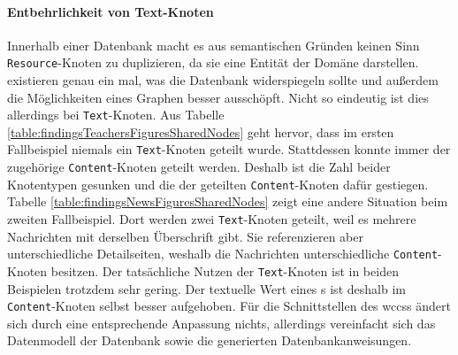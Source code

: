     \paragraph*{Entbehrlichkeit von Text-Knoten}
    Innerhalb einer Datenbank macht es aus semantischen Gründen keinen Sinn
    \texttt{Resource}-Knoten zu duplizieren,
    da sie eine Entität der Domäne darstellen.
    {\resources} existieren genau ein mal, was die Datenbank widerspiegeln sollte
    und außerdem die Möglichkeiten eines Graphen besser ausschöpft.
    Nicht so eindeutig ist dies allerdings bei \texttt{Text}-Knoten.
    Aus Tabelle \ref{table:findingsTeachersFiguresSharedNodes} geht hervor,
    dass im ersten Fallbeispiel niemals ein \texttt{Text}-Knoten geteilt wurde.
    Stattdessen konnte immer der zugehörige \texttt{Content}-Knoten geteilt werden.
    Deshalb ist die Zahl beider Knotentypen gesunken und die der geteilten
    \texttt{Content}-Knoten dafür gestiegen.
    Tabelle \ref{table:findingsNewsFiguresSharedNodes}
    zeigt eine andere Situation beim zweiten Fallbeispiel.
    Dort werden zwei \texttt{Text}-Knoten geteilt,
    weil es mehrere Nachrichten mit derselben Überschrift gibt.
    Sie referenzieren aber unterschiedliche Detailseiten,
    weshalb die Nachrichten unterschiedliche \texttt{Content}-Knoten besitzen.
    Der tatsächliche Nutzen der \texttt{Text}-Knoten ist in beiden Beispielen trotzdem sehr gering.
    Der textuelle Wert eines {\contentFeature}s ist deshalb im \texttt{Content}-Knoten selbst besser aufgehoben.
    Für die Schnittstellen des \glspl{wccs} ändert sich durch eine entsprechende Anpassung nichts,
    allerdings vereinfacht sich das Datenmodell der Datenbank sowie
    die generierten Datenbankanweisungen.

